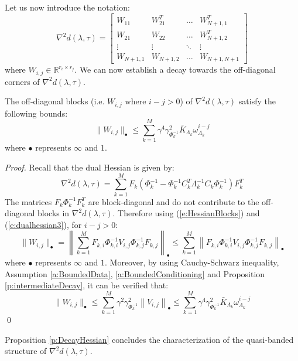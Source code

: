 Let us now introduce the notation:
\begin{equation} \label{e:HessianBlocks}
\nabla^2 d(\lambda, \tau) = \left[ \begin{array}{cccc}
W_{11} & W_{21}^T & \hdots & W_{N+1,1}^T \\
W_{21} & W_{22} & \hdots & W_{N+1,2}^T \\
\vdots & \vdots  & \ddots & \vdots \\
W_{N+1,1} & W_{N+1,2} & \hdots & W_{N+1,N+1}
\end{array} \right]
\end{equation}
where $W_{i,j} \in \mathbb{R}^{r_i \times r_j}$. We can now establish a decay towards the off-diagonal corners of $\nabla^2 d(\lambda, \tau)$.

\begin{proposition} \label{p:DecayHessian}
The off-diagonal blocks (i.e. $W_{i,j}$ where $i - j > 0$) of $\nabla^2 d(\lambda, \tau)$ satisfy the following bounds:
\begin{equation}
\label{e:DecayHessian}
\| W_{i,j} \|_\bullet \leq \sum_{k=1}^M \gamma^4 \gamma_{\Phi_k^{-1}}^2 \bar{K}_{\Lambda_k} \omega_{\Lambda_k}^{i-j} 
\end{equation}
where $\bullet$ represents $\infty$ and $1$.
\end{proposition}
\begin{proof}
Recall that the dual Hessian is given by:
\begin{equation} \label{e:dualhessian3}
\nabla^2 d(\lambda, \tau) = \sum_{k=1}^M F_k (\Phi_k^{-1} - \Phi_k^{-1} C_k^T \Lambda_k^{-1} C_k \Phi_k^{-1}) F_k^T
\end{equation}
The matrices $F_k \Phi_k^{-1} F_k^T$ are block-diagonal and do not contribute to the off-diagonal blocks in $\nabla^2 d(\lambda, \tau)$. Therefore using (\ref{e:HessianBlocks}) and (\ref{e:dualhessian3}), for $i - j > 0$:
\begin{equation}
\| W_{i,j} \|_\bullet = \left\| \sum_{k=1}^M F_{k,i} \Phi_{k,i}^{-1} V_{i,j} \Phi_{k,j}^{-1} F_{k,j} \right\|_\bullet \leq \sum_{k=1}^M \left\| F_{k,i} \Phi_{k,i}^{-1} V_{i,j} \Phi_{k,j}^{-1} F_{k,j} \right\|_\bullet
\end{equation}
where $\bullet$ represents $\infty$ and $1$. Moreover, by using Cauchy-Schwarz inequality, Assumption \ref{a:BoundedData}, \ref{a:BoundedConditioning} and Proposition \ref{p:intermediateDecay}, it can be verified that:
\begin{equation}
\| W_{i,j} \|_\bullet \leq \sum_{k=1}^M \gamma^2 \gamma_{\Phi_k^{-1}}^2 \left\| V_{i,j} \right\|_\bullet \leq \sum_{k=1}^M \gamma^4 \gamma_{\Phi_k^{-1}}^2 \bar{K}_{\Lambda_k} \omega_{\Lambda_k}^{i-j}
\end{equation}
\qed
\end{proof}
Proposition \ref{p:DecayHessian} concludes the characterization of the quasi-banded structure of $\nabla^2 d(\lambda,\tau)$. 

